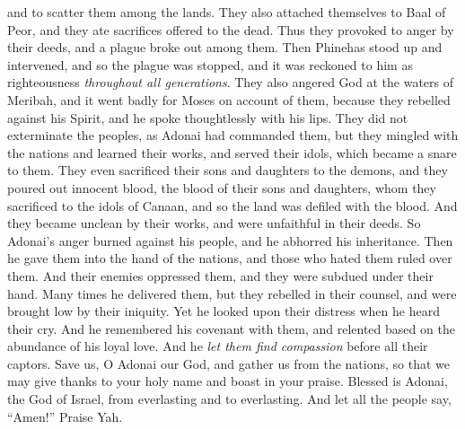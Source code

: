 \begin{biblechapter}
and to scatter them among the lands.
\verse They also attached themselves to Baal of Peor, 
and they ate sacrifices offered to the dead.
\verse Thus they provoked to anger by their deeds, 
and a plague broke out among them.
\verse Then Phinehas stood up and intervened, 
and so the plague was stopped,
\verse and it was reckoned to him as righteousness 
\textit{throughout all generations}.
\verse They also angered God at the waters of Meribah, 
and it went badly for Moses on account of them,
\verse because they rebelled against his Spirit, 
and he spoke thoughtlessly with his lips.
\verse They did not exterminate the peoples, 
as Adonai had commanded them, 
\verse but they mingled with the nations 
and learned their works,
\verse and served their idols, 
which became a snare to them.
\verse They even sacrificed their sons and daughters 
to the demons,
\verse and they poured out innocent blood, 
the blood of their sons and daughters, 
whom they sacrificed to the idols of Canaan, 
and so the land was defiled with the blood.
\verse And they became unclean by their works, 
and were unfaithful in their deeds.
\verse So Adonai’s anger burned against his people, 
and he abhorred his inheritance.
\verse Then he gave them into the hand of the nations, 
and those who hated them ruled over them.
\verse And their enemies oppressed them, 
and they were subdued under their hand.
\verse Many times he delivered them, 
but they rebelled in their counsel, 
and were brought low by their iniquity.
\verse Yet he looked upon their distress 
when he heard their cry.
\verse And he remembered his covenant with them, 
and relented based on the abundance of his loyal love.
\verse And he \textit{let them find compassion} 
before all their captors.
\verse Save us, O Adonai our God, 
and gather us from the nations, 
so that we may give thanks to your holy name 
and boast in your praise.
\verse Blessed is Adonai, the God of Israel, 
from everlasting and to everlasting. 
And let all the people say, “Amen!” 
Praise Yah.
\end{biblechapter}

